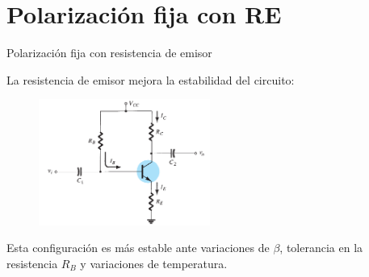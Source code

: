 \documentclass[t,aspectratio=169]{beamer}
\begin{document}
\section{Polarización fija con RE}
\begin{frame}{Polarización fija con resistencia de emisor}

La resistencia de emisor mejora la estabilidad del circuito:

\begin{figure}
    \centering
    \includegraphics[width=0.5\textwidth]{figures/polarizacion_fija_RE.png}
\end{figure}

Esta configuración es más estable ante variaciones de $\beta$, tolerancia en la resistencia $R_B$ y variaciones de temperatura.

\end{frame}
\end{document}
